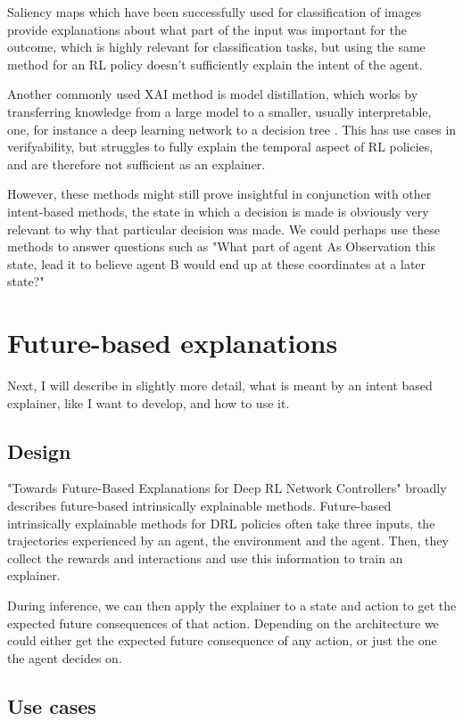 \documentclass[UKenglish]{uiomasterthesis}
\begin{document}
Saliency maps which have been successfully used for classification of images provide explanations about what part of the input was important for the outcome, which is highly relevant for classification tasks, but using the same method for an RL policy doesn't sufficiently explain the intent of the agent\cite{atrey2020exploratory}.

Another commonly used XAI method is model distillation, which works by transferring knowledge from a large model to a smaller, usually interpretable, one, for instance a deep learning network to a decision tree \cite{bastani2019verifiable}. This has use cases in verifyability, but struggles to fully explain the temporal aspect of RL policies, and are therefore not sufficient as an explainer.

However, these methods might still prove insightful in conjunction with other intent-based methods, the state in which a decision is made is obviously very relevant to why that particular decision was made. We could perhaps use these methods to answer questions such as "What part of agent As Observation this state, lead it to believe agent B would end up at these coordinates at a later state?"
\medskip

\section{Future-based explanations}
Next, I will describe in slightly more detail, what is meant by an intent based explainer, like I want to develop, and how to use it.

\subsection{ Design}
"Towards Future-Based Explanations for Deep RL Network Controllers"\cite{10.1145/3626570.3626607} broadly describes future-based intrinsically explainable methods. Future-based intrinsically explainable methods for DRL policies often take three inputs, the trajectories experienced by an agent, the environment and the agent. Then, they collect the rewards and interactions and use this information to train an explainer.

During inference, we can then apply the explainer to a state and action to get the expected future consequences of that action. Depending on the architecture we could either get the expected future consequence of any action, or just the one the agent decides on.

\subsection{ Use cases}
\end{document}
